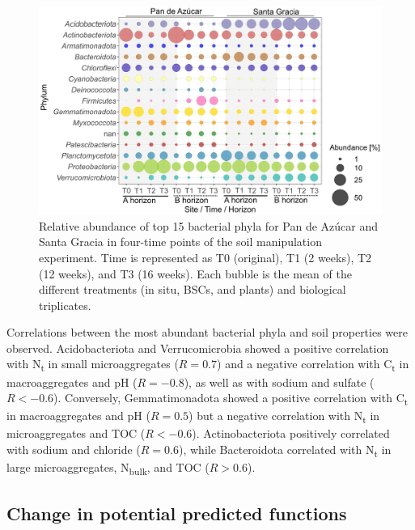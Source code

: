 \begin{figure}[H]
	\centering
	\includegraphics[width=1\textwidth]{img/M3-Figure_5.jpg}
	\caption{Relative abundance of top 15 bacterial phyla for Pan de Azúcar and Santa Gracia in four-time points of the soil manipulation experiment. Time is represented as T0 (original), T1 (2 weeks), T2 (12 weeks), and T3 (16 weeks). Each bubble is the mean of the different treatments (in situ, BSCs, and plants) and biological triplicates.}
	\label{fig:M3-F5}
\end{figure}

Correlations between the most abundant bacterial phyla and soil properties were observed. Acidobacteriota and Verrucomicrobia showed a positive correlation with N\textsubscript{t} in small microaggregates (\(R=0.7\)) and a negative correlation with C\textsubscript{t} in macroaggregates and pH (\(R=-0.8\)), as well as with sodium and sulfate (\(R < -0.6\)). Conversely, Gemmatimonadota showed a positive correlation with C\textsubscript{t} in macroaggregates and pH (\(R=0.5\)) but a negative correlation with N\textsubscript{t} in microaggregates and TOC (\(R < -0.6\)). Actinobacteriota positively correlated with sodium and chloride (\(R=0.6\)), while Bacteroidota correlated with N\textsubscript{t} in large microaggregates, N\textsubscript{bulk}, and TOC (\(R > 0.6\)).

\subsection{Change in potential predicted functions}

